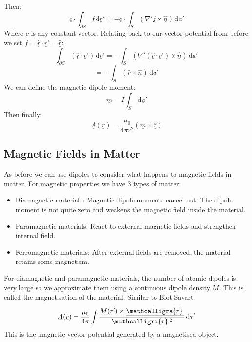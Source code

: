 \documentclass[12pt]{article}
\newcommand{\scriptr}{\ensuremath{\mathcalligra{r}}\,}
\begin{document}
Then:
\[\underline{c}\cdot\int_{\partial S}f\,\text{d}\underline{r}'=-\underline{c}\cdot\int_S(\underline{\nabla}'f\times\underline{\hat{n}})\,\text{d}a'\]
Where \(\underline{c}\) is any constant vector. Relating back to our vector potential from before we set \(f=\underline{\hat{r}}\cdot\underline{r}'=\underline{\hat{r}}\):
\[\int_{\partial S}(\underline{\hat{r}}\cdot\underline{r}')\,\text{d}\underline{r}'=-\int_S(\underline{\nabla}'(\underline{\hat{r}}\cdot\underline{r}')\times\underline{\hat{n}})\,\text{d}a'\]
\[=-\int_S(\underline{\hat{r}}\times\underline{\hat{n}})\,\text{d}a'\]
We can define the magnetic dipole moment:
\[\underline{m}=I\int_S\,\text{d}\underline{a}'\]
Then finally:
\[\underline{A}(\underline{r})=\frac{\mu_0}{4\pi r^2}(\underline{m}\times\underline{\hat{r}})\]
\subsection{Magnetic Fields in Matter}
As before we can use dipoles to consider what happens to magnetic fields in matter. For magnetic properties we have 3 types of matter:
\begin{itemize}
    \item Diamagnetic materials: Magnetic dipole moments cancel out. The dipole moment is not quite zero and weakens the magnetic field inside the material.
    \item Paramagnetic materials: React to external magnetic fields and strengthen internal field.
    \item Ferromagnetic materials: After external fields are removed, the material retains some magnetism.
\end{itemize}
For diamagnetic and paramagnetic materials, the number of atomic dipoles is very large so we approximate them using a continuous dipole density \(\underline{M}\). This is called the magnetisation of the material. Similar to Biot-Savart:
\[\underline{A}(\underline{r})=\frac{\mu_0}{4\pi}\int\frac{\underline{M}(\underline{r}')\times \underline{\hat{\scriptr}}}{\scriptr^2}\,\text{d}\tau'\]
This is the magnetic vector potential generated by a magnetised object.
\end{document}
